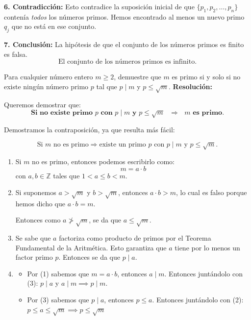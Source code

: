 \documentclass[a4paper,12pt]{article}
\begin{document}
\begin{ejercicio}[title=Ejercicio 14]
\vspace{0.5em}

\textbf{6. Contradicción:}  
Esto contradice la suposición inicial de que $\{p_1, p_2, \dots, p_n\}$ contenía \emph{todos} los números primos.  
Hemos encontrado al menos un nuevo primo $q_j$ que no está en ese conjunto.

\textbf{7. Conclusión:}  
La hipótesis de que el conjunto de los números primos es finito es falsa.
\[
\boxed{\text{El conjunto de los números primos es infinito.}}
\]

\end{ejercicio}

\begin{ejercicio}[title=Ejercicio 16]
Para cualquier número entero $m\ge 2$, demuestre que $m$ es primo si y solo si no existe ningún número primo $p$ tal que $p\mid m$ y $p\le \sqrt{m}$.
\tcblower
\textbf{Resolución:}

\vspace{0.4em}
Queremos demostrar que:
\[\textbf{Si no existe primo $p$ con $p\mid m$ y $p\le\sqrt{m}$ $\Rightarrow$ $m$ es primo.}\]

Demostramos la contraposición, ya que resulta más fácil:

\[
\text{Si } m \text{ no es primo} \Rightarrow \text{existe un primo } p \text{ con } p\mid m \text{ y } p\le\sqrt{m}.
\]

\begin{enumerate}

\item Si $m$ no es primo, entonces podemos escribirlo como:
\[
m = a\cdot b
\]
con $a,b \in \mathbb{Z}$ tales que $1<a\le b<m$.

\item Si suponemos $a > \sqrt m$ y $b > \sqrt m$, entonces $a \cdot b > m$, lo cual es falso porque hemos dicho que $a \cdot b = m$.

Entonces como $a \not> \sqrt m$, se da que $a \le \sqrt m$.

\item Se sabe que $a$ factoriza como producto de primos por el Teorema Fundamental de la Aritmética. Esto garantiza que $a$ tiene por lo menos un factor primo $p$. Entonces se da que $p \mid a$.

\item \begin{itemize}
    \item Por (1) sabemos que $m = a \cdot b$, entonces $a \mid m$. Entonces juntándolo con (3): $p \mid a$ y $a \mid m \implies \boxed{p \mid m}$.
    \item Por (3) sabemos que $p \mid a$, entonces $p \le a$. Entonces juntándolo con (2): $p \le a \le \sqrt m \implies \boxed{p \le \sqrt m}$
\end{itemize}


\end{enumerate}
\end{ejercicio}
\end{document}
